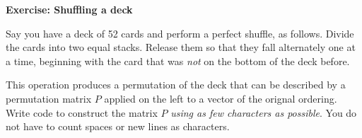 \documentclass[11pt]{article}
\begin{document}
\begin{center}
  \bf Exercise: Shuffling a deck 
\end{center}

Say you have a deck of 52 cards and perform a perfect shuffle, as
follows. Divide the cards into two equal stacks. Release them so that
they fall alternately one at a time, beginning with the card that was
\emph{not} on the bottom of the deck before.

This operation produces a permutation of the deck that can be
described by a permutation matrix $P$ applied on the left to a vector of the
orignal ordering. Write code to construct the matrix $P$ \emph{using
  as few characters as possible}. You do not have to count spaces or new lines as characters. 
\end{document}
